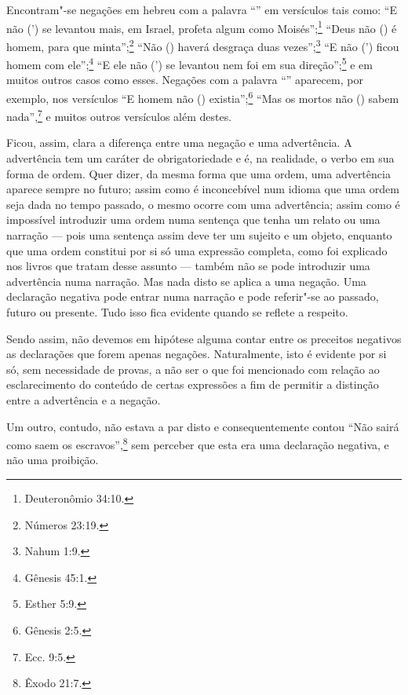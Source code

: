 Encontram"-se negações em hebreu com a palavra ``'' em versículos tais
como: ``E não (') se levantou mais, em Israel, profeta algum como
Moisés'';\footnote{Deuteronômio 34:10.} ``Deus não () é homem, para que minta'';\footnote{Números 23:19.} ``Não () haverá desgraça duas vezes'';\footnote{Nahum 1:9.}
``E não (') ficou homem com ele'';\footnote{Gênesis 45:1.} ``E ele não
(') se levantou nem foi em sua direção'';\footnote{Esther 5:9.} e em muitos
outros casos como esses. Negações com a palavra ``'' aparecem, por
exemplo, nos versículos ``E homem não () existia'';\footnote{Gênesis 2:5.} ``Mas os mortos não ()
sabem nada'',\footnote{Ecc. 9:5.} e muitos outros versículos além destes.

Ficou, assim, clara a diferença entre uma negação e uma advertência. A
advertência tem um caráter de obrigatoriedade e é, na realidade, o verbo
em sua forma de ordem. Quer dizer, da mesma forma que uma ordem, uma
advertência aparece sempre no futuro; assim como é inconcebível num
idioma que uma ordem seja dada no tempo passado, o mesmo ocorre com uma
advertência; assim como é impossível introduzir uma ordem numa sentença
que tenha um relato ou uma narração --- pois uma sentença assim deve
ter um sujeito e um objeto, enquanto que uma ordem constitui por si só
uma expressão completa, como foi explicado nos livros que tratam desse
assunto --- também não se pode introduzir uma advertência numa narração.
Mas nada disto se aplica a uma negação. Uma declaração negativa pode
entrar numa narração e pode referir"-se ao passado, futuro ou presente.
Tudo isso fica evidente quando se reflete a respeito.

Sendo assim, não devemos em hipótese alguma contar entre os preceitos
negativos as declarações que forem apenas negações. Naturalmente, isto é
evidente por si só, sem necessidade de provas, a não ser o que foi
mencionado com relação ao esclarecimento do conteúdo de certas
expressões a fim de permitir a distinção entre a advertência e a
negação.

Um outro, contudo, não estava a par disto e consequentemente contou
``Não sairá como saem os escravos'',\footnote{Êxodo 21:7.} sem perceber que esta
era uma declaração negativa, e não uma proibição.

